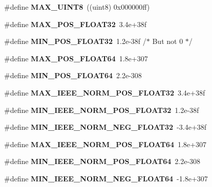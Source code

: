 \begin{DoxyCompactItemize}
\item 
\#define {\bfseries M\-A\-X\-\_\-\-U\-I\-N\-T8}~((uint8)  0x000000ff)\label{prim__type_8h_a05682ca8de174141447ff05a2289a27c}

\item 
\#define {\bfseries M\-A\-X\-\_\-\-P\-O\-S\-\_\-\-F\-L\-O\-A\-T32}~3.\-4e+38f\label{prim__type_8h_a763737bb762908f1014777705e1bd5e0}

\item 
\#define {\bfseries M\-I\-N\-\_\-\-P\-O\-S\-\_\-\-F\-L\-O\-A\-T32}~1.\-2e-\/38f	/$\ast$ But not 0 $\ast$/\label{prim__type_8h_a6ebe6d883694f66620b6d2dd94dc38e8}

\item 
\#define {\bfseries M\-A\-X\-\_\-\-P\-O\-S\-\_\-\-F\-L\-O\-A\-T64}~1.\-8e+307\label{prim__type_8h_a63f40e6ca19e802259413c04cc56bd28}

\item 
\#define {\bfseries M\-I\-N\-\_\-\-P\-O\-S\-\_\-\-F\-L\-O\-A\-T64}~2.\-2e-\/308\label{prim__type_8h_a2fc3595771a7d0f944470fd9ba07cfad}

\item 
\#define {\bfseries M\-A\-X\-\_\-\-I\-E\-E\-E\-\_\-\-N\-O\-R\-M\-\_\-\-P\-O\-S\-\_\-\-F\-L\-O\-A\-T32}~3.\-4e+38f\label{prim__type_8h_ab806e0c70417e38f2302635bbb78c8c5}

\item 
\#define {\bfseries M\-I\-N\-\_\-\-I\-E\-E\-E\-\_\-\-N\-O\-R\-M\-\_\-\-P\-O\-S\-\_\-\-F\-L\-O\-A\-T32}~1.\-2e-\/38f\label{prim__type_8h_a8b4a04ec8b6561c6f831dfd2434fd505}

\item 
\#define {\bfseries M\-I\-N\-\_\-\-I\-E\-E\-E\-\_\-\-N\-O\-R\-M\-\_\-\-N\-E\-G\-\_\-\-F\-L\-O\-A\-T32}~-\/3.\-4e+38f\label{prim__type_8h_a7dcce0312b93eb66d4e662fd035560bf}

\item 
\#define {\bfseries M\-A\-X\-\_\-\-I\-E\-E\-E\-\_\-\-N\-O\-R\-M\-\_\-\-P\-O\-S\-\_\-\-F\-L\-O\-A\-T64}~1.\-8e+307\label{prim__type_8h_a424bb3e6f9a39ec4d9f0ed965ab92026}

\item 
\#define {\bfseries M\-I\-N\-\_\-\-I\-E\-E\-E\-\_\-\-N\-O\-R\-M\-\_\-\-P\-O\-S\-\_\-\-F\-L\-O\-A\-T64}~2.\-2e-\/308\label{prim__type_8h_aa8adb129a54c32e19ba7cc9171779687}

\item 
\#define {\bfseries M\-I\-N\-\_\-\-I\-E\-E\-E\-\_\-\-N\-O\-R\-M\-\_\-\-N\-E\-G\-\_\-\-F\-L\-O\-A\-T64}~-\/1.\-8e+307\label{prim__type_8h_ad8550cd6490d48fd6f4949626084fbdb}


\end{DoxyCompactItemize}
